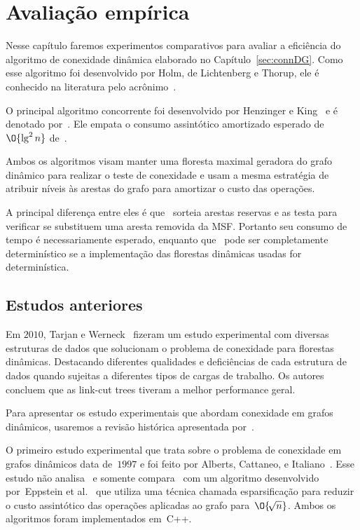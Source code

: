 \chapter{Avaliação empírica}
\label{sec:avaliacao-empirica}

Nesse capítulo faremos experimentos comparativos para avaliar a eficiência do algoritmo de conexidade dinâmica elaborado no Capítulo~\ref{sec:connDG}. Como esse algoritmo foi desenvolvido  por Holm, de Lichtenberg e Thorup, ele é conhecido na literatura pelo acrônimo~\HDT.

O principal algoritmo concorrente foi desenvolvido por Henzinger e King~\cite{HenzingerKing} e é denotado por~\HK.
Ele empata o consumo assintótico amortizado esperado de $\O{\lg^2 n}$ de~\HDT.

Ambos os algoritmos visam manter uma floresta maximal geradora do grafo dinâmico para realizar o teste de conexidade e usam a mesma estratégia de atribuir níveis às arestas do grafo para amortizar o custo das operações.

A principal diferença entre eles é que~\HK{} sorteia arestas reservas e as testa para verificar se substituem uma aresta removida da MSF. Portanto seu consumo de tempo é necessariamente esperado, enquanto que~\HDT{} pode ser completamente determinístico se a implementação das florestas dinâmicas usadas for determinística. 

\section{Estudos anteriores}

Em $2010$, Tarjan e Werneck~\cite{tarjanWerneck2010} fizeram um estudo experimental com diversas estruturas de dados que solucionam o problema de conexidade para florestas dinâmicas.
Destacando diferentes qualidades e deficiências de cada estrutura de dados quando sujeitas a diferentes tipos de cargas de trabalho.
Os autores concluem que as link-cut trees tiveram a melhor performance geral.

Para apresentar os estudo experimentais que abordam conexidade em grafos dinâmicos, usaremos a revisão histórica apresentada por~\cite{Zaroliagis2002}.

O primeiro estudo experimental que trata sobre o problema de conexidade em grafos dinâmicos data de~$1997$ e foi feito por Alberts, Cattaneo, e Italiano~\cite{EmpiricalStudy1997}.
Esse estudo não analisa~\HDT{} e somente compara~\HK{} com um algoritmo desenvolvido por~Eppstein et al.~\cite{Eppstein1992SparsificationaTF} que utiliza uma técnica chamada esparsificação para reduzir o custo assintótico das operações aplicadas ao grafo para~$\O{\!\sqrt{n}}$.
Ambos os algoritmos foram implementados em~C++.

